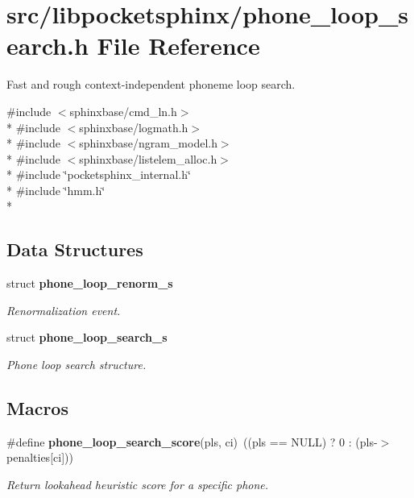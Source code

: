 \section{src/libpocketsphinx/phone\+\_\+loop\+\_\+search.h File Reference}
\label{phone__loop__search_8h}


Fast and rough context-\/independent phoneme loop search.  


{\ttfamily \#include $<$sphinxbase/cmd\+\_\+ln.\+h$>$}\\*
{\ttfamily \#include $<$sphinxbase/logmath.\+h$>$}\\*
{\ttfamily \#include $<$sphinxbase/ngram\+\_\+model.\+h$>$}\\*
{\ttfamily \#include $<$sphinxbase/listelem\+\_\+alloc.\+h$>$}\\*
{\ttfamily \#include \char`\"{}pocketsphinx\+\_\+internal.\+h\char`\"{}}\\*
{\ttfamily \#include \char`\"{}hmm.\+h\char`\"{}}\\*
\subsection*{Data Structures}
\begin{DoxyCompactItemize}
\item 
struct {\bf phone\+\_\+loop\+\_\+renorm\+\_\+s}
\begin{DoxyCompactList}\small\item\em Renormalization event. \end{DoxyCompactList}\item 
struct {\bf phone\+\_\+loop\+\_\+search\+\_\+s}
\begin{DoxyCompactList}\small\item\em Phone loop search structure. \end{DoxyCompactList}\end{DoxyCompactItemize}
\subsection*{Macros}
\begin{DoxyCompactItemize}
\item 
\#define {\bf phone\+\_\+loop\+\_\+search\+\_\+score}(pls,  ci)~((pls == N\+U\+L\+L) ? 0 \+: (pls-\/$>$penalties[ci]))\label{phone__loop__search_8h_ab49609ce2ff4d1827f57693f463e360b}

\begin{DoxyCompactList}\small\item\em Return lookahead heuristic score for a specific phone. \end{DoxyCompactList}\end{DoxyCompactItemize}

